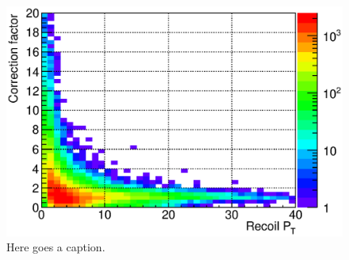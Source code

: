 \documentclass[12pt]{article}
\begin{document}
\begin{figure}[htbp]
\begin{center}
\includegraphics[scale=0.8]{images/plot_PtCorrFactor}
\end{center}
\caption{Here goes a caption.}
\label{fig:plot_PtCorrFactor} 
\end{figure}
\end{document}
